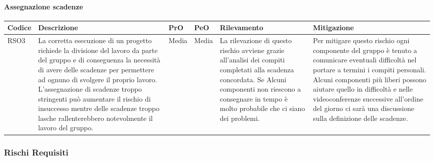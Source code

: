 \paragraph{Assegnazione scadenze}
		\begin{center}

	\begin{longtable}{p{1cm}|p{4cm}|p{0.7cm}|p{0.7cm}|p{3cm}|p{4cm}}
		\arrayrulecolor{white}
		\hline
		\rowcolor{blue!20}
		\textbf{Codice} & 
		\textbf{Descrizione} &
		\textbf{PrO}  &
		\textbf{PeO}  &				        
		\textbf{Rilevamento} &
		\textbf{Mitigazione} \\
		\hline	
		RSO3 & La corretta esecuzione di un progetto richiede la divisione del lavoro da parte del gruppo e di conseguenza la necessità di avere delle scadenze per permettere ad ognuno di svolgere il proprio lavoro. L'assegnazione di scadenze troppo stringenti può aumentare il rischio di insuccesso mentre delle scadenze troppo lasche rallenterebbero notevolmente il lavoro del gruppo. & Media & Media & La rilevazione di questo rischio avviene grazie all'analisi dei compiti completati alla scadenza concordata. Se Alcuni componenti non riescono a consegnare in tempo è molto probabile che ci siano dei problemi. & Per mitigare questo rischio ogni componente del gruppo è tenuto a comunicare eventuali difficoltà nel portare a termini i compiti personali. Alcuni componenti più liberi possono aiutare quello in difficoltà e nelle videoconferenze successive all'ordine del giorno ci sarà una discussione sulla definizione delle scadenze. \\
		\end{longtable}
\end{center}
\subsubsection{Rischi Requisiti}
